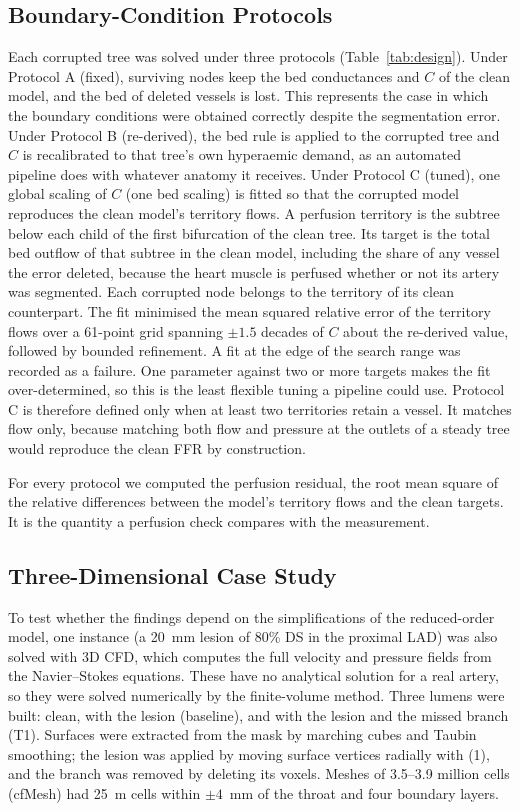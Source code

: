 \documentclass[journal]{IEEEtran}
\begin{document}
\subsection{Boundary-Condition Protocols}
Each corrupted tree was solved under three protocols (Table~\ref{tab:design}). Under Protocol A (fixed), surviving
nodes keep the bed conductances and $C$ of the clean model, and the bed of deleted vessels is lost. This represents
the case in which the boundary conditions were obtained correctly despite the segmentation error. Under Protocol B
(re-derived), the bed rule is applied to the corrupted tree and $C$ is recalibrated to that tree's own hyperaemic
demand, as an automated pipeline does with whatever anatomy it receives. Under Protocol C (tuned), one global
scaling of $C$ (one bed scaling) is fitted so that the corrupted model reproduces the clean model's territory
flows. A perfusion territory is the subtree below each child of
the first bifurcation of the clean tree. Its target is the total bed outflow of that subtree in the clean model,
including the share of any vessel the error deleted, because the heart muscle is perfused whether or not its artery
was segmented. Each corrupted node belongs to the territory of its clean counterpart. The fit minimised the mean
squared relative error of the territory flows over a 61-point grid spanning $\pm 1.5$ decades of $C$ about the
re-derived value, followed by bounded refinement. A fit at the edge of the search range was recorded as a failure.
One parameter against two or more targets makes the fit over-determined, so this is the least flexible tuning a
pipeline could use. Protocol C is therefore defined only when at least two territories retain a vessel. It matches
flow only, because matching both flow and pressure at the outlets of a steady tree would reproduce the clean FFR by
construction.

For every protocol we computed the perfusion residual, the root mean square of the relative differences between the
model's territory flows and the clean targets. It is the quantity a perfusion check compares with the measurement.

\subsection{Three-Dimensional Case Study}
To test whether the findings depend on the simplifications of the reduced-order model, one instance (a 20~mm lesion
of 80\% DS in the proximal LAD) was also solved with 3D CFD, which computes the full velocity and pressure fields
from the Navier--Stokes equations. These have no analytical solution for a real artery, so they were solved
numerically by the finite-volume method. Three lumens were built: clean, with the lesion (baseline), and with the
lesion and the missed branch (T1). Surfaces were extracted from the mask by marching cubes and Taubin smoothing; the
lesion was applied by moving surface vertices radially with (1), and the branch was removed by deleting its voxels.
Meshes of 3.5--3.9 million cells (cfMesh) had 25~\textmu m cells within $\pm 4$~mm of the throat and four boundary
layers.
\end{document}
